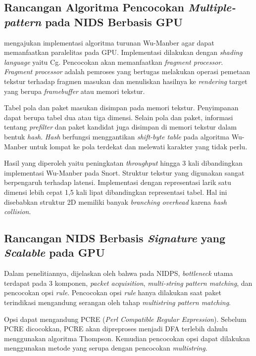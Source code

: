   \subsection{Rancangan Algoritma Pencocokan \emph{Multiple-pattern} pada NIDS Berbasis GPU}

    \cite{4482891} mengajukan implementasi algoritma turunan Wu-Manber agar dapat memanfaatkan paralelitas pada GPU. Implementasi dilakukan dengan \emph{shading language} yaitu Cg. Pencocokan akan memanfaatkan \emph{fragment processor}. \emph{Fragment processor} adalah pemroses yang bertugas melakukan operasi pemetaan tekstur terhadap fragmen masukan dan menuliskan hasilnya ke \emph{rendering} target yang berupa \emph{framebuffer} atau memori tekstur.

    Tabel pola dan paket masukan disimpan pada memori tekstur. Penyimpanan dapat berupa tabel dua atau tiga dimensi. Selain pola dan paket, informasi tentang \emph{prefilter} dan paket kandidat juga disimpan di memori tekstur dalam bentuk \emph{hash}. \emph{Hash} berfungsi menggantikan \emph{shift-byte table} pada algoritma Wu-Manber untuk lompat ke pola terdekat dan melewati karakter yang tidak perlu.

    Hasil yang diperoleh yaitu peningkatan \emph{throughput} hingga 3 kali dibandingkan implementasi Wu-Manber pada Snort. Struktur tekstur yang digunakan sangat berpengaruh terhadap latensi. Implementasi dengan representasi larik satu dimensi lebih cepat 1,5 kali lipat dibandingkan representasi tabel. Hal ini disebabkan struktur 2D memiliki banyak \emph{branching overhead} karena \emph{hash collision}.

  \subsection{Rancangan NIDS Berbasis \emph{Signature} yang \emph{Scalable} pada GPU}

    Dalam penelitiannya, dijelaskan oleh \cite{kargus2012} bahwa pada NIDPS, \emph{bottleneck} utama terdapat pada 3 komponen, \emph{packet acquisition}, \emph{multi-string pattern matching}, dan pencocokan opsi \emph{rule}. Pencocokan opsi \emph{rule} hanya dilakukan saat paket terindikasi mengandung serangan oleh tahap \emph{multistring pattern matching}. 
    
    Opsi dapat mengandung PCRE (\emph{Perl Compatible Regular Expression}). Sebelum PCRE dicocokkan, PCRE akan dipreproses menjadi DFA terlebih dahulu menggunakan algoritma Thompson. Kemudian pencocokan opsi dapat dilakukan menggunakan metode yang serupa dengan pencocokan \emph{multistring}.

